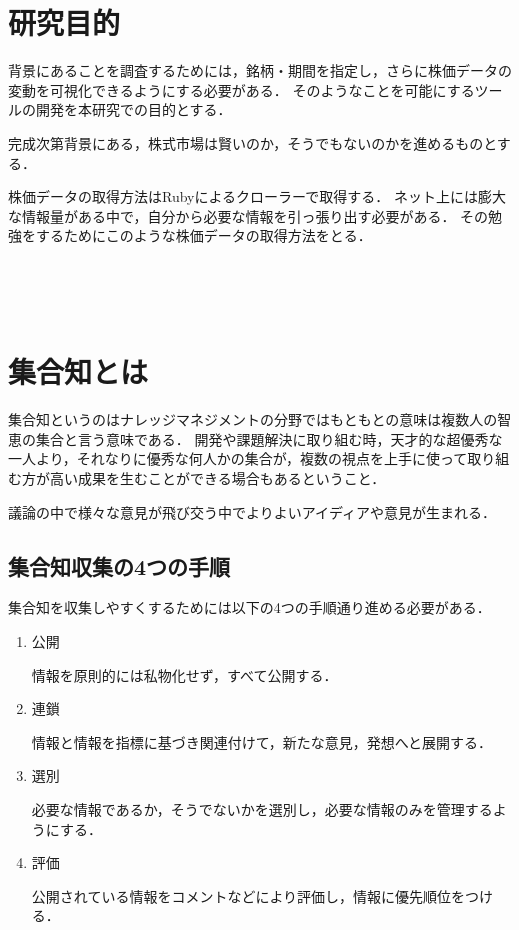\chapter{研究目的}


背景にあることを調査するためには，銘柄・期間を指定し，さらに株価データの変動を可視化できるようにする必要がある．
そのようなことを可能にするツールの開発を本研究での目的とする．

完成次第背景にある，株式市場は賢いのか，そうでもないのかを進めるものとする．


株価データの取得方法はRubyによるクローラーで取得する．
ネット上には膨大な情報量がある中で，自分から必要な情報を引っ張り出す必要がある．
その勉強をするためにこのような株価データの取得方法をとる．

　　　　　　　　　


	　　　　　　　　　　　　　　　　　　　　　　　　　　　　　　　　　　　　　　　　　　　　　　　　　　　　　　　　　　　　　　　　　　　　　　　　　　　　　　　　　




\chapter{集合知とは}

集合知というのはナレッジマネジメントの分野ではもともとの意味は複数人の智恵の集合と言う意味である．
開発や課題解決に取り組む時，天才的な超優秀な一人より，それなりに優秀な何人かの集合が，複数の視点を上手に使って取り組む方が高い成果を生むことができる場合もあるということ．

議論の中で様々な意見が飛び交う中でよりよいアイディアや意見が生まれる．

\section{集合知収集の4つの手順}
集合知を収集しやすくするためには以下の4つの手順通り進める必要がある．
\begin{enumerate}
  \item 公開

情報を原則的には私物化せず，すべて公開する．

  \item 連鎖

情報と情報を指標に基づき関連付けて，新たな意見，発想へと展開する．

  \item 選別

必要な情報であるか，そうでないかを選別し，必要な情報のみを管理するようにする．
  \item 評価

公開されている情報をコメントなどにより評価し，情報に優先順位をつける．




\end{enumerate}


